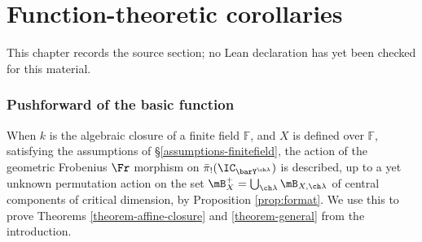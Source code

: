 \chapter{Function-theoretic corollaries}
\label{intersection-complexes-unramified-l-factors-chapter-09}

\begin{remark}
\label{intersection-complexes-unramified-l-factors-chapter-09-source}
This chapter records the source section; no Lean declaration has yet been checked for this material.
\notready
\end{remark}

\subsection{Pushforward of the basic function} \label{sect:finitefields}

When $k$ is the algebraic closure of a finite field $\mathbb F$, and $X$ is defined over $\mathbb F$, satisfying the assumptions of \S \ref{assumptions-finitefield}, the action of the geometric Frobenius $\Fr$ morphism on $ \bar\pi_!(\IC_{\barY^{\ch\lambda}})$ is described, up to a yet unknown permutation action on the set $\mB^+_X = \bigcup_{\ch\lambda} \mB_{X,\ch\lambda}$ of central components of critical dimension, by Proposition \ref{prop:format}. We use this to prove Theorems \ref{theorem-affine-closure} and \ref{theorem-general} from the introduction.




